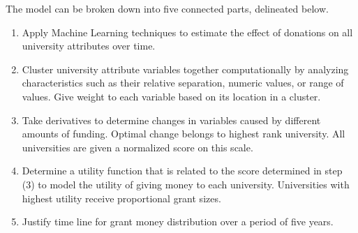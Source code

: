 \documentclass[paper.tex]{subfiles}
\begin{document}
	The model can be broken down into five connected parts, delineated below.
	\begin{enumerate}
		\item Apply Machine Learning techniques to estimate the effect of donations on all university attributes over time.
		\item Cluster university attribute variables together computationally by analyzing characteristics such as their relative separation, numeric values, or range of values. Give weight to each variable based on its location in a cluster.
		\item Take derivatives to determine changes in variables caused by different amounts of funding. Optimal change belongs to highest rank university. All universities are given a normalized score on this scale.
		\item Determine a utility function that is related to the score determined in step (3) to model the utility of giving money to each university. Universities with highest utility receive proportional grant sizes.
		\item Justify time line for grant money distribution over a period of five years.
	\end{enumerate}
	
	
\end{document}
